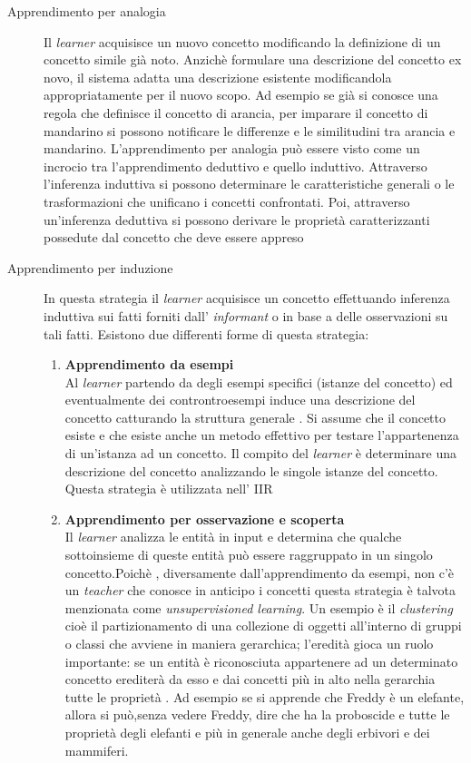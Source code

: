 \begin{description}
\item[Apprendimento per analogia]Il \textit{learner} acquisisce un nuovo concetto modificando la definizione di un concetto simile già noto. Anzichè formulare una descrizione del concetto ex novo, il sistema adatta una descrizione esistente modificandola appropriatamente per il nuovo scopo. Ad esempio se già si conosce una regola che definisce il concetto di arancia, per imparare il concetto di mandarino si possono notificare le differenze e le similitudini tra arancia e mandarino. L’apprendimento per analogia può essere visto come un incrocio tra l’apprendimento deduttivo e quello induttivo. Attraverso l’inferenza induttiva si possono determinare le caratteristiche generali o le trasformazioni che unificano i concetti confrontati. Poi, attraverso un’inferenza deduttiva si possono derivare le proprietà caratterizzanti possedute dal concetto che deve essere appreso
\item[Apprendimento per induzione]In questa strategia  il \textit{learner} acquisisce un concetto effettuando inferenza induttiva sui fatti forniti dall' \textit{informant} o in base a delle osservazioni su tali fatti. Esistono due differenti forme di questa strategia:
\begin{enumerate}
\item \textbf{Apprendimento da esempi}\\
Al \textit{learner} partendo da degli esempi specifici (istanze del concetto) ed eventualmente dei controntroesempi induce una descrizione del concetto catturando la struttura generale . Si assume che il concetto esiste e che esiste anche un metodo effettivo per testare l'appartenenza di un'istanza ad un concetto.  Il compito del \textit{learner} è determinare una descrizione del concetto  analizzando le singole istanze del concetto. Questa strategia è utilizzata nell' \ac{IIR} 
\item \textbf{Apprendimento per osservazione e scoperta}\\
Il \textit{learner}  analizza le entità  in input e determina che qualche sottoinsieme di queste entità può essere raggruppato in un singolo concetto.Poichè , diversamente dall'apprendimento da esempi, non c'è un \textit{teacher} che conosce in anticipo i concetti questa strategia è talvota menzionata come \emph{unsupervisioned learning}. Un esempio è il \emph{clustering} cioè il partizionamento di una collezione di oggetti all'interno di gruppi o classi che avviene in maniera gerarchica; l'eredità gioca un ruolo importante: se un entità è riconosciuta appartenere ad un determinato concetto erediterà da esso e dai concetti più in alto nella gerarchia  tutte le proprietà . Ad esempio se si apprende che Freddy è un elefante, allora si può,senza vedere Freddy, dire che ha la proboscide e tutte le proprietà degli elefanti e più in generale  anche degli erbivori e dei mammiferi.
\end{enumerate}
\end{description}

